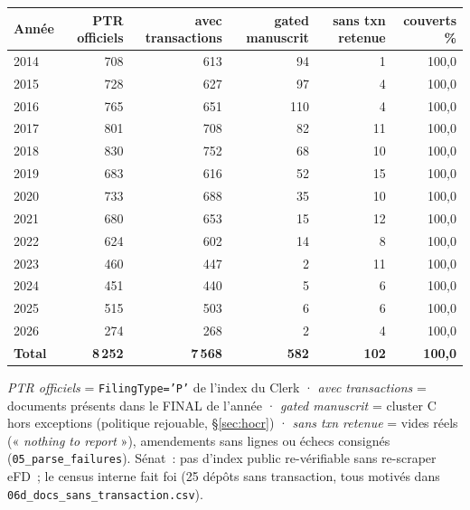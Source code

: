 \documentclass[11pt,a4paper]{article}
\newcommand{\co}[1]{\texttt{\small #1}}
\begin{document}
\begin{center}\small
\begin{tabular}{l rrrrr}
\toprule
\bfseries Année & \bfseries PTR officiels & \bfseries avec transactions & \bfseries gated manuscrit & \bfseries sans txn retenue & \bfseries couverts \%\\
\midrule
2014 & 708 & 613 & 94 & 1 & 100,0 \\
2015 & 728 & 627 & 97 & 4 & 100,0 \\
2016 & 765 & 651 & 110 & 4 & 100,0 \\
2017 & 801 & 708 & 82 & 11 & 100,0 \\
2018 & 830 & 752 & 68 & 10 & 100,0 \\
2019 & 683 & 616 & 52 & 15 & 100,0 \\
2020 & 733 & 688 & 35 & 10 & 100,0 \\
2021 & 680 & 653 & 15 & 12 & 100,0 \\
2022 & 624 & 602 & 14 & 8 & 100,0 \\
2023 & 460 & 447 & 2 & 11 & 100,0 \\
2024 & 451 & 440 & 5 & 6 & 100,0 \\
2025 & 515 & 503 & 6 & 6 & 100,0 \\
2026 & 274 & 268 & 2 & 4 & 100,0 \\
\midrule
\bfseries Total & \bfseries 8\,252 & \bfseries 7\,568 & \bfseries 582 & \bfseries 102 & \bfseries 100,0 \\
\bottomrule
\end{tabular}
\end{center}
{\footnotesize \emph{PTR officiels} = \co{FilingType='P'} de l'index du Clerk · \emph{avec transactions} =
documents présents dans le FINAL de l'année · \emph{gated manuscrit} = cluster C hors exceptions (politique
rejouable, \S{}\ref{sec:hocr}) · \emph{sans txn retenue} = vides réels (« \emph{nothing to report} »),
amendements sans lignes ou échecs consignés (\co{05_parse_failures}). Sénat~: pas d'index public
re-vérifiable sans re-scraper eFD~; le census interne fait foi (25 dépôts sans transaction, tous motivés
dans \co{06d_docs_sans_transaction.csv}).}
\end{document}
